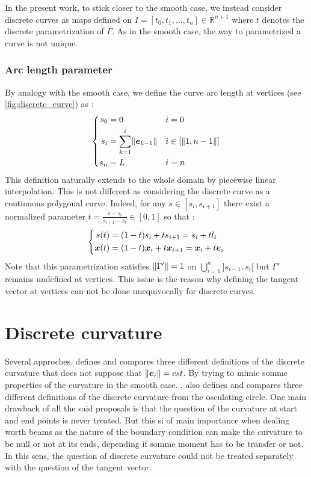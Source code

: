 In the present work, to stick closer to the smooth case, we instead consider discrete curves as maps defined on $I = [t_0, t_1, \ldots, t_n] \in \mathbb{R}^{n+1}$ where $t$ denotes the discrete parametrization of $\Gamma$. As in the smooth case, the way to parametrized a curve is not unique.

\subsubsection{Arc length parameter}
By analogy with the smooth case, we define the curve arc length at vertices (see \cref{fig:discrete_curve}) as :
\begin{equation}
	\left\{
	\begin{aligned}
		s_0 	&= 0 								& 	&i = 0		\\
		s_i 	&= \sum_{k=1}^i \lVert\boldsymbol{e}_{k-1}\rVert		&	&i \in [\|1, n-1\|]	\\
		s_n 	&=  L 								&	&i = n		\\
	\end{aligned}
	\right.
\end{equation}
This definition naturally extends to the whole domain by piecewise linear interpolation. This is not different as considering the discrete curve as a continuous polygonal curve. Indeed, for any $s \in [s_i, s_{i+1}]$ there exist a normalized parameter $t = \frac{s - s_i}{s_{i+1} - s_i} \in [0,1]$ so that :
\begin{equation}
	\left\{
	\begin{aligned}
		s(t) &= (1-t) s_i + t s_{i+1} = s_i + t l_i \\
		\boldsymbol{x}(t) &= (1-t) \boldsymbol{x}_i  + t \boldsymbol{x}_{i+1} =  \boldsymbol{x}_i + t  \boldsymbol{e}_i 
	\end{aligned}
	\right.
\end{equation}
Note that this parametrization satisfies $\lVert\Gamma'\rVert=1$ on $\bigcup_{i=1}^n ]s_{i-1}, s_i[$ but $\Gamma'$ remains undefined at vertices. This issue is the reason why defining the tangent vector at vertices can not be done unequivocally for discrete curves.

\section{Discrete curvature}
Several approches. \cite{Vouga2014} defines and compares three different definitions of the discrete curvature that does not suppose that $\lVert\boldsymbol{e}_i\rVert = cst$. By trying to mimic somme properties of the curvature in the smooth case. \cite{Bobenko2015}. \cite{Carroll2014} also defines and compares three different definitions of the discrete curvature from the osculating circle. One main drawback of all the said proposals is that the question of the curvature at  start and end points is never treated. But this si of main importance when dealing worth beams as the nature of the boundary condition can make the curvature to be null or not at its ends, depending if somme moment has to be transfer or not. In this sens, the question of discrete curvature could not be treated separately with the question of the tangent vector.
%
%

